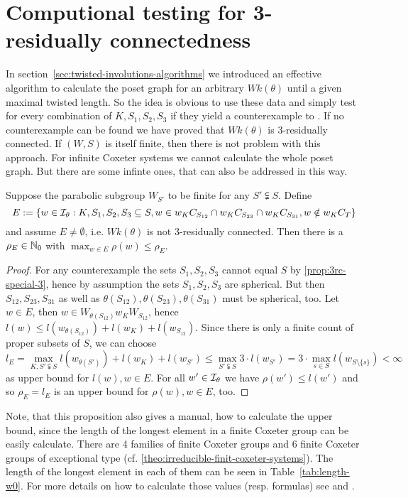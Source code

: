 \section{Computional testing for 3-residually connectedness}
\label{sec:3rc-compution-testing}

In section~\ref{sec:twisted-involutions-algorithms} we introduced an effective algorithm to calculate the poset graph for an arbitrary $Wk(\theta)$ until a given maximal twisted length. So the idea is obvious to use these data and simply test for every combination of $K,S_1,S_2,S_3$ if they yield a counterexample to . If no counterexample can be found we have proved that $Wk(\theta)$ is 3-residually connected. If $(W,S)$ is itself finite, then there is not problem with this approach. For infinite Coxeter systems we cannot calculate the whole poset graph. But there are some infinte ones, that can also be addressed in this way.

\begin{prop}
	Suppose the parabolic subgroup $W_{S'}$ to be finite for any $S' \subsetneqq S$. Define
	$$ E := \{ w \in \mathcal{I}_{\theta} : K,S_1,S_2,S_3 \subseteq S, w \in w_K C_{S_{12}} \cap w_K C_{S_{23}} \cap w_K C_{S_{31}}, w \notin w_K C_T \} $$
	and assume $E \neq \emptyset$, i.e. $Wk(\theta)$ is not 3-residually connected. Then there is a $\rho_E \in \mathbb{N}_0$ with $\max_{w \in E} \rho(w) \leq \rho_E$.

	\begin{proof}
		For any counterexample the sets $S_1,S_2,S_3$ cannot equal $S$ by \ref{prop:3rc-special-3}, hence by assumption the sets $S_1,S_2,S_3$ are spherical. But then $S_{12},S_{23},S_{31}$ as well as $\theta(S_{12}),\theta(S_{23}),\theta(S_{31})$ must be spherical, too. Let $w \in E$, then $w \in W_{\theta(S_{12})} w_K W_{S_{12}}$, hence $l(w) \leq l(w_{\theta(S_{12})}) + l(w_K) + l(w_{S_{12}})$. Since there is only a finite count of proper subsets of $S$, we can choose
		$$ l_E = \max_{K,S' \subsetneqq S} l(w_{\theta(S')}) + l(w_K) + l(w_{S'}) \leq \max_{S' \subsetneqq S} 3 \cdot l(w_{S'}) = 3 \cdot \max_{s \in S} l(w_{S \setminus \{s\}}) < \infty $$
		as upper bound for $l(w), w \in E$. For all $w' \in \mathcal{I}_{\theta}$ we have $\rho(w') \leq l(w')$ and so $\rho_E = l_E$ is an upper bound for $\rho(w), w \in E$, too.
	\end{proof}
\end{prop}

\begin{rema}
	Note, that this proposition also gives a manual, how to calculate the upper bound, since the length of the longest element in a finite Coxeter group can be easily calculate. There are 4 families of finite Coxeter groups and 6 finite Coxeter groups of exceptional type (cf. \ref{theo:irreducible-finit-coxeter-systems}). The length of the longest element in each of them can be seen in Table~\ref{tab:length-w0}. For more details on how to calculate those values (resp. formulas) see \cite[Section 1.2]{franzsen:automorphisms} and \cite[Section 2.11]{humphreys:coxeter}.
\end{rema}

